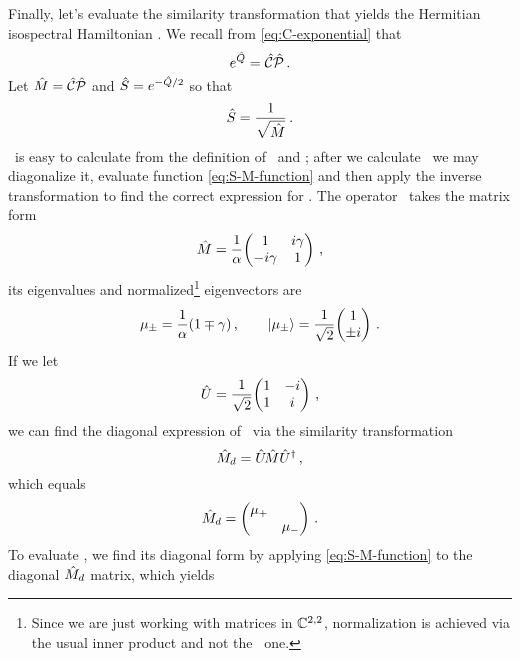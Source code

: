         Finally, let's evaluate the similarity transformation that yields the Hermitian isospectral Hamiltonian \hF. We recall from \eqref{eq:C-exponential} that
        \begin{equation*}
            e^{\hat{Q}} = \mathcal{\hat{C}}\mathcal{\hat{P}}
            \,\text{.}
        \end{equation*}
        Let $\hat{M} = \mathcal{\hat{C}}\mathcal{\hat{P}}$ and $\hat{S} = e^{-\hat{Q}/2}$ so that
        \begin{equation}
            \label{eq:S-M-function}
            \hat{S} = \frac{1}{\sqrt{\hat{M}}}
            \,\text{.}
        \end{equation}
        \hM\ is easy to calculate from the definition of \hC\ and \hP; after we calculate \hM\ we may diagonalize it, evaluate function \eqref{eq:S-M-function} and then apply the inverse transformation to find the correct expression for \hS. The operator \hM\ takes the matrix form
        \begin{equation*}
            \hM = \frac{1}{\alpha}\!\pmqty{\admat[1]{i\gamma, -i\gamma}}
            \mycomma
        \end{equation*}
        its eigenvalues and normalized\footnote{Since we are just working with matrices in $\mathbb{C}^{2,2}$, normalization is achieved via the usual inner product and not the \PT\ one.} eigenvectors are
        \begin{equation*}
            \mu_{\pm} = \frac{1}{\alpha}\pqty{1 \mp \gamma}
            \mycomma
            \qquad
            \ket{\mu_\pm} = \frac{1}{\sqrt{2}}\!\pmqty{1 \\ \pm i}
            \myperiod
        \end{equation*}
        If we let
        \begin{equation*}
            \hU = \frac{1}{\sqrt{2}}\!\pmqty{1 & -i \\ 1 & i}
            \mycomma
        \end{equation*}
        we can find the diagonal expression of \hM\ via the similarity transformation
        \begin{equation}
            \hat{M}_d = \hat{U} \!\hat{M} \hat{U}^\dag
            \,\text{,}
        \end{equation}
        which equals
        \begin{equation*}
            \hM_d = \pmqty{\dmat{\mu_{+}, \mu_{-}}}
            \myperiod
        \end{equation*}
        To evaluate \hS, we find its diagonal form by applying \eqref{eq:S-M-function} to the diagonal $\hat{M}_d$ matrix, which yields
